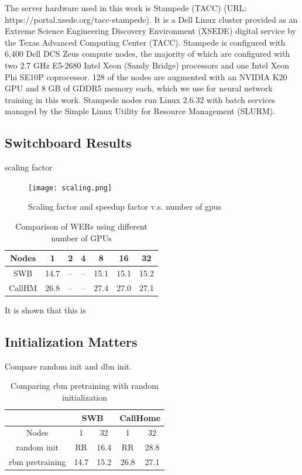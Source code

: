 \documentclass{article}
\begin{document}
The server hardware used in this work is Stampede (TACC) (URL: https://portal.xsede.org/tacc-stampede). It is a Dell Linux 
cluster provided as an Extreme Science Engineering Discovery Environment (XSEDE) digital service by the Texas Advanced 
Computing Center (TACC). Stampede is configured with 6,400 Dell DCS Zeus compute nodes, the majority of which are configured
with two 2.7 GHz E5-2680 Intel Xeon (Sandy Bridge) processors and one Intel Xeon Phi SE10P coprocessor. 128 of the nodes are 
augmented with an NVIDIA K20 GPU and 8 GB of GDDR5 memory each, which we use for neural network training in this work.
Stampede nodes run Linux 2.6.32 with batch services managed by the Simple Linux Utility for Resource Management (SLURM).

\subsection{Switchboard Results}
scaling factor
\begin{figure}[htb]
  \centering
  \texttt{[image: scaling.png]}
  \caption{Scaling factor and speedup factor v.s. number of gpus}
  \label{fig:scaling}
\end{figure}

\begin{table}
  \centering
  \begin{tabular}{c|c|c|c|c|c|c}
    \hline
     Nodes  & 1    & 2    & 4   & 8      & 16     & 32\\
    \hline
    SWB     & 14.7 & --   & --  & 15.1   & 15.1   & 15.2\\
    CallHM  & 26.8 & --   & --  & 27.4   & 27.0   & 27.1 \\
    \hline
  \end{tabular}
  \caption{Comparison of WERs using different number of GPUs}
  \label{tab:wer}
\end{table}

It is shown that this is

\subsection{Initialization Matters}
\label{sec:init}
Compare random init and dbn init.

\begin{table}
  \centering
  \begin{tabular}{c|c|c|c|c}
    \hline
    & \multicolumn{2}{c|}{SWB}  & \multicolumn{2}{c}{CallHome} \\
    \hline
    Nodes          &  1     & 32     &   1    & 32\\
    \hline
    random init     & RR    & 16.4   &  RR    & 28.8 \\
    \hline
    rbm pretraining & 14.7  & 15.2   & 26.8   & 27.1 \\
    \hline
  \end{tabular}
  \caption{Comparing rbm pretraining with random initialization}
  \label{tab:init}
\end{table}
\end{document}
